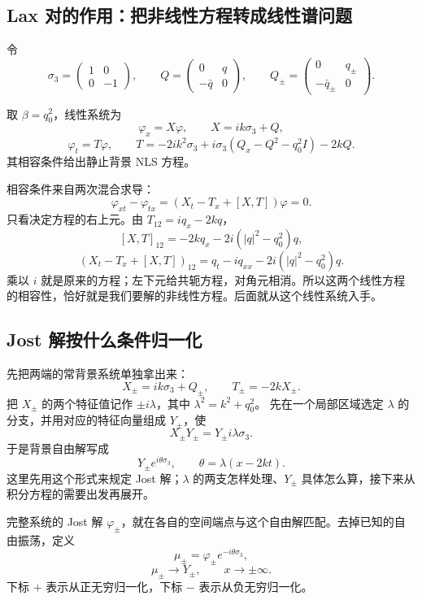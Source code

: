 \documentclass[lang=cn,scheme=chinese,mode=simple,device=normal,color=blue,math=cm,thmcnt=section,12pt]{elegantbook}
\newcommand{\eqq}[2]{\tag{#1}\label{eq:#1}#2}
\begin{document}
\subsection*{Lax 对的作用：把非线性方程转成线性谱问题}
令
\[
\sigma_3=\begin{pmatrix}1&0\\0&-1\end{pmatrix},\qquad
Q=\begin{pmatrix}0&q\\-\bar q&0\end{pmatrix},\qquad
Q_\pm=\begin{pmatrix}0&q_\pm\\-\bar q_\pm&0\end{pmatrix}.
\]
\setcounter{proposition}{0}
\begin{proposition}
取 $\beta=q_0^2$，线性系统为
\begin{equation}\eqq{6.2.13}{\varphi_x=X\varphi,\qquad
X=ik\sigma_3+Q,}\end{equation}
\begin{equation}\eqq{6.2.14}{\varphi_t=T\varphi,\qquad
T=-2ik^2\sigma_3+i\sigma_3(Q_x-Q^2-q_0^2I)-2kQ.}\end{equation}
其相容条件给出静止背景 NLS 方程。
\end{proposition}
相容条件来自两次混合求导：
\[
\varphi_{xt}-\varphi_{tx}=(X_t-T_x+[X,T])\varphi=0.
\]
只看决定方程的右上元。由 $T_{12}=iq_x-2kq$，
\[
[X,T]_{12}=-2kq_x-2i(|q|^2-q_0^2)q,
\]
\[
(X_t-T_x+[X,T])_{12}
=q_t-iq_{xx}-2i(|q|^2-q_0^2)q.
\]
乘以 $i$ 就是原来的方程；左下元给共轭方程，对角元相消。所以这两个线性方程的相容性，恰好就是我们要解的非线性方程。后面就从这个线性系统入手。

\subsection*{Jost 解按什么条件归一化}
先把两端的常背景系统单独拿出来：
\[
X_\pm=ik\sigma_3+Q_\pm,\qquad T_\pm=-2kX_\pm.
\]
把 $X_\pm$ 的两个特征值记作 $\pm i\lambda$，其中 $\lambda^2=k^2+q_0^2$。
先在一个局部区域选定 $\lambda$ 的分支，并用对应的特征向量组成 $Y_\pm$，使
\[
X_\pm Y_\pm=Y_\pm i\lambda\sigma_3.
\]
于是背景自由解写成
\[
Y_\pm e^{i\theta\sigma_3},\qquad \theta=\lambda(x-2kt).
\]
这里先用这个形式来规定 Jost 解；$\lambda$ 的两支怎样处理、$Y_\pm$ 具体怎么算，接下来从积分方程的需要出发再展开。

完整系统的 Jost 解 $\varphi_\pm$，就在各自的空间端点与这个自由解匹配。去掉已知的自由振荡，定义
\begin{equation}\eqq{6.4.3}{\mu_\pm=\varphi_\pm e^{-i\theta\sigma_3},}\end{equation}
\begin{equation}\eqq{6.4.4}{\mu_\pm\longrightarrow Y_\pm,\qquad x\to\pm\infty.}\end{equation}
下标 $+$ 表示从正无穷归一化，下标 $-$ 表示从负无穷归一化。
\end{document}
